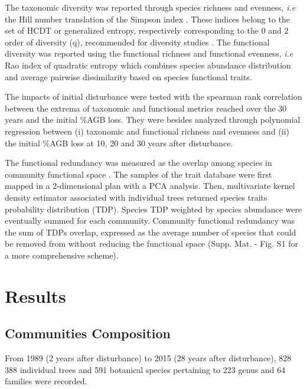 \documentclass[fleqn,10pt]{ArtEcoFoG} %
\begin{document}
The taxonomic diversity was reported through species richness and
evenness, \emph{i.e} the Hill number translation of the Simpson index
\citep{Hill1973}. These indices belong to the set of HCDT or generalized
entropy, respectively corresponding to the 0 and 2 order of diversity
(q), recommended for diversity studies \citep{Marcon2015b}. The
functional diversity was reported using the functional richness and
functional evenness, \emph{i.e} Rao index of quadratic entropy which
combines species abundance distribution and average pairwise
dissimilarity based on species functional traits.

The impacts of initial disturbance were tested with the spearman rank
correlation between the extrema of taxonomic and functional metrics
reached over the 30 years and the initial \%AGB loss. They were besides
analyzed through polynomial regression between (i) taxonomic and
functional richness and evenness and (ii) the initial \%AGB loss at 10,
20 and 30 years after disturbance.

The functional redundancy was measured as the overlap among species in
community functional space \citep{Carmona2016}. The samples of the trait
database were first mapped in a 2-dimensional plan with a PCA analysis.
Then, multivariate kernel density estimator associated with individual
trees returned species traits probability distribution (TDP). Species
TDP weighted by species abundance were eventually summed for each
community. Community functional redundancy was the sum of TDPs overlap,
expressed as the average number of species that could be removed from
without reducing the functional space (Supp. Mat. - Fig. S1 for a more
comprehensive scheme).

\section{Results}\label{results}

\subsection{Communities Composition}\label{communities-composition}

From 1989 (2 years after disturbance) to 2015 (28 years after
disturbance), 828 388 individual trees and 591 botanical species
pertaining to 223 genus and 64 families were recorded.
\end{document}
